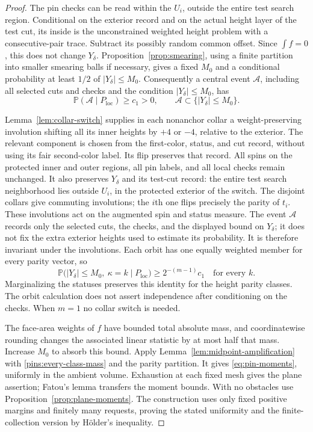 \documentclass[11pt]{article}
\theoremstyle{definition}
\theoremstyle{remark}
\numberwithin{equation}{section}
\begin{document}
\begin{proof}
The pin checks can be read within the $U_i$, outside the entire test
search region.  Conditional on the exterior record and on the actual
height layer of the test cut, its inside is the unconstrained weighted
height problem with a consecutive-pair trace.  Subtract its possibly
random common offset.  Since $\int f=0$, this does not change
$Y_\delta$.  Proposition~\ref{prop:smearing}, using a finite partition
into smaller smearing balls if necessary, gives a fixed $M_0$ and a
conditional probability at least $1/2$ of $|Y_\delta|\le M_0$.
Consequently a central event $\mathcal A$, including all selected cuts
and checks and the condition $|Y_\delta|\le M_0$, has
\begin{equation}\label{pins:central-unpartitioned}
 \mathbb P(\mathcal A\mid P_{\mathrm{loc}})\ge c_1>0,
 \qquad \mathcal A\subset\{|Y_\delta|\le M_0\}.
\end{equation}

Lemma~\ref{lem:collar-switch} supplies in each nonanchor collar a
weight-preserving involution shifting all its inner heights by $+4$
or $-4$, relative to the exterior.  The relevant component is chosen
from the first-color, status, and cut record, without using its fair
second-color label.  Its flip preserves that record.  All spins on
the protected inner and outer regions, all pin labels, and all local
checks remain unchanged.  It also preserves $Y_\delta$ and its test-cut
record: the entire test search neighborhood lies outside $U_i$, in the
protected exterior of the switch.  The disjoint collars give commuting involutions;
the $i$th one flips precisely the parity of $t_i$.  These involutions
act on the augmented spin and status measure.  The event $\mathcal A$
records only the selected cuts, the checks, and the displayed bound on
$Y_\delta$; it does not fix the extra exterior heights used to estimate
its probability.  It is therefore invariant under the involutions.
Each orbit has one equally weighted
member for every parity vector, so
\begin{equation}\label{pins:every-class-mass}
 \mathbb P\bigl(|Y_\delta|\le M_0,\ \kappa=k
                   \mid P_{\mathrm{loc}}\bigr)
 \ge 2^{-(m-1)}c_1\quad\text{for every }k.
\end{equation}
Marginalizing the statuses preserves this identity for the height
parity classes.  The orbit calculation does not assert independence
after conditioning on the checks.  When $m=1$ no collar switch is needed.

The face-area weights of $f$ have bounded total absolute mass, and
coordinatewise rounding changes the associated linear statistic by
at most half that mass.  Increase $M_0$ to absorb this bound.  Apply
Lemma~\ref{lem:midpoint-amplification} with
\eqref{pins:every-class-mass} and the parity partition.  It gives
\eqref{eq:pin-moments}, uniformly in the ambient volume.  Exhaustion
at each fixed mesh gives the plane assertion; Fatou's lemma transfers
the moment bounds.  With no obstacles use
Proposition~\ref{prop:plane-moments}.  The construction uses only fixed
positive margins and finitely many requests, proving the stated
uniformity and the finite-collection version by H\"older's inequality.
\end{proof}
\end{document}
